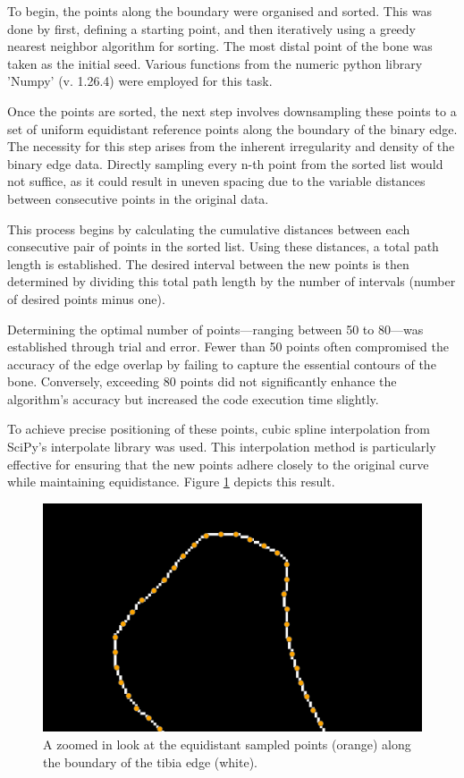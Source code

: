 \documentclass{micro-econ-thesis}
\begin{document}
To begin, the points along the boundary were organised and sorted. This was done by first, defining a starting point, and then iteratively using a greedy nearest neighbor algorithm for sorting. The most distal point of the bone was taken as the initial seed. Various functions from the numeric python library 'Numpy' (v. 1.26.4) were employed for this task. 


Once the points are sorted, the next step involves downsampling these points to a set of uniform equidistant reference points along the boundary of the binary edge. The necessity for this step arises from the inherent irregularity and density of the binary edge data. Directly sampling every n-th point from the sorted list would not suffice, as it could result in uneven spacing due to the variable distances between consecutive points in the original data.

This process begins by calculating the cumulative distances between each consecutive pair of points in the sorted list. Using these distances, a total path length is established. The desired interval between the new points is then determined by dividing this total path length by the number of intervals (number of desired points minus one). 

Determining the optimal number of points—ranging between 50 to 80—was established through trial and error. Fewer than 50 points often compromised the accuracy of the edge overlap by failing to capture the essential contours of the bone. Conversely, exceeding 80 points did not significantly enhance the algorithm's accuracy but increased the code execution time slightly. 

To achieve precise positioning of these points, cubic spline interpolation from SciPy's interpolate library was used. This interpolation method is particularly effective for ensuring that the new points adhere closely to the original curve while maintaining equidistance. 
Figure \ref{fig:downsampled} depicts this result. 
\begin{figure}[H]
	\centering
	\includegraphics[width=0.7\linewidth]{downsampled}
	\caption{A zoomed in look at the equidistant sampled points (orange) along the boundary of the tibia edge (white).}
	\label{fig:downsampled}
\end{figure}
\end{document}
